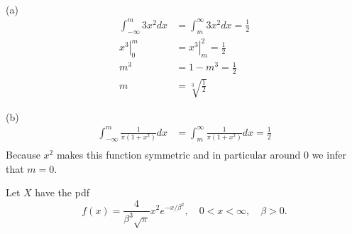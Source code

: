 \documentclass[12pt,letterpaper]{exam}
\begin{document}
\begin{questions}
	
	\begin{solution} \\
		(a)
		\begin{align*}
			\int_{-\infty}^{m} 3x^2 dx &= \int_{m}^{\infty} 3x^2 dx = \frac{1}{2} \\
			\left. x^3 \right|_{0}^{m} &= \left. x^3 \right|_{m}^{2} = \frac{1}{2} \\
			m^3 &= 1-m^3 = \frac{1}{2} \\
			m &= \sqrt[3]{\frac{1}{2}}
		\end{align*}
		
		(b)
		\begin{align*}
			\int_{-\infty}^{m} \frac{1}{\pi(1+x^2)} dx &= \int_{m}^{\infty} \frac{1}{\pi(1+x^2)} dx = \frac{1}{2} \\
		\end{align*}
		Because $x^2$ makes this function symmetric and in particular around $0$
		we infer that $m=0$.
		
	\end{solution}

	\setcounter{question}{21}
	\question Let $X$ have the pdf $$ f(x) = \frac{4}{\beta^3\sqrt{\pi}} x^2 e^{-x/\beta^2},\quad 0 < x < \infty,\quad \beta > 0.$$
	

\end{questions}
\end{document}
